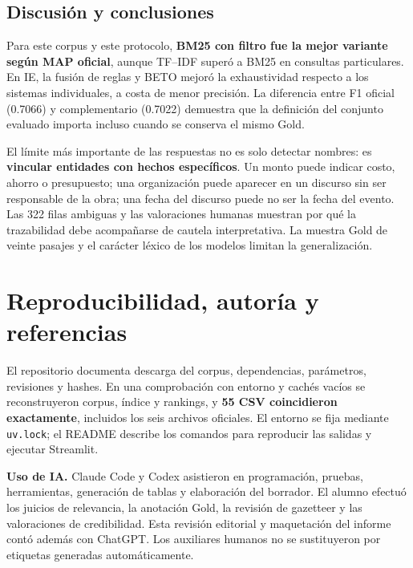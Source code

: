 \documentclass[10pt,a4paper]{article}
\begin{document}
\subsection{Discusión y conclusiones}
Para este corpus y este protocolo, \textbf{BM25 con filtro fue la mejor variante según MAP oficial}, aunque TF--IDF superó a BM25 en consultas particulares. En IE, la fusión de reglas y BETO mejoró la exhaustividad respecto a los sistemas individuales, a costa de menor precisión. La diferencia entre F1 oficial (0.7066) y complementario (0.7022) demuestra que la definición del conjunto evaluado importa incluso cuando se conserva el mismo Gold.

El límite más importante de las respuestas no es solo detectar nombres: es \textbf{vincular entidades con hechos específicos}. Un monto puede indicar costo, ahorro o presupuesto; una organización puede aparecer en un discurso sin ser responsable de la obra; una fecha del discurso puede no ser la fecha del evento. Las 322 filas ambiguas y las valoraciones humanas muestran por qué la trazabilidad debe acompañarse de cautela interpretativa. La muestra Gold de veinte pasajes y el carácter léxico de los modelos limitan la generalización.

\section{Reproducibilidad, autoría y referencias}
El repositorio documenta descarga del corpus, dependencias, parámetros, revisiones y hashes. En una comprobación con entorno y cachés vacíos se reconstruyeron corpus, índice y rankings, y \textbf{55 CSV coincidieron exactamente}, incluidos los seis archivos oficiales. El entorno se fija mediante \texttt{uv.lock}; el README describe los comandos para reproducir las salidas y ejecutar Streamlit.

\textbf{Uso de IA.} Claude Code y Codex asistieron en programación, pruebas, herramientas, generación de tablas y elaboración del borrador. El alumno efectuó los juicios de relevancia, la anotación Gold, la revisión de gazetteer y las valoraciones de credibilidad. Esta revisión editorial y maquetación del informe contó además con ChatGPT. Los auxiliares humanos no se sustituyeron por etiquetas generadas automáticamente.
\end{document}
